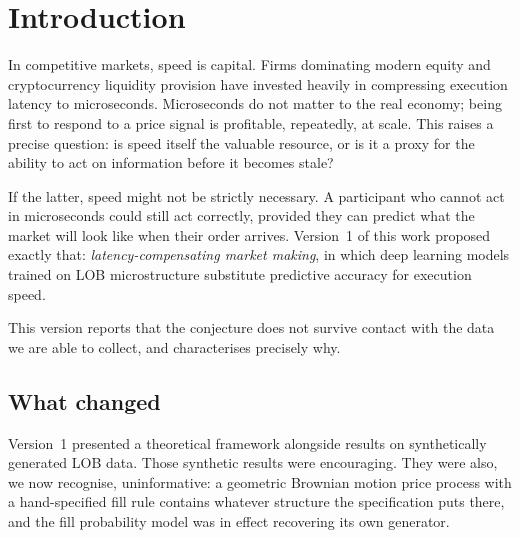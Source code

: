 \documentclass[11pt]{article}
\begin{document}
\begin{abstract}
\vspace{0.8em}
\noindent\textbf{Keywords:} market making, market microstructure, limit order
book, fill probability, execution latency, retail trading, negative results,
survival analysis

\vspace{0.3em}
\noindent\textbf{JEL:} G12, G14, C45, C61, G23
\end{abstract}

\vspace{1em}

\section{Introduction}

In competitive markets, speed is capital. Firms dominating modern equity and
cryptocurrency liquidity provision have invested heavily in compressing
execution latency to microseconds. Microseconds do not matter to the real
economy; being first to respond to a price signal is profitable, repeatedly, at
scale. This raises a precise question: is speed
itself the valuable resource, or is it a proxy for the ability to act on
information before it becomes stale?

If the latter, speed might not be strictly necessary. A participant who cannot
act in microseconds could still act correctly, provided they can predict what
the market will look like when their order arrives. Version~1 of this work
proposed exactly that: \emph{latency-compensating market making}, in which deep
learning models trained on LOB microstructure substitute predictive accuracy for
execution speed.

This version reports that the conjecture does not survive contact with the data
we are able to collect, and characterises precisely why.

\subsection{What changed}

Version~1 presented a theoretical framework alongside results on synthetically
generated LOB data. Those synthetic results were encouraging. They were also,
we now recognise, uninformative: a geometric Brownian motion price process with
a hand-specified fill rule contains whatever structure the specification puts
there, and the fill probability model was in effect recovering its own
generator.
\end{document}
